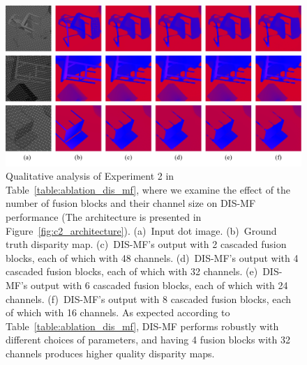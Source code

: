 \begin{figure}[t]
    \begin{center}
        \includegraphics[width=1.0\linewidth]{images/chapter2/supp_figures/ablation_mf_blch.jpg}
    \end{center}
   \caption{Qualitative analysis of Experiment 2 in Table~\ref{table:ablation_dis_mf}, where we examine the effect of the number of fusion blocks and their channel size on DIS-MF performance (The architecture is presented in Figure~\ref{fig:c2_architecture}). (a)~Input dot image. (b)~Ground truth disparity map. (c)~DIS-MF's output with 2 cascaded fusion blocks, each of which with 48 channels. (d)~DIS-MF's output with 4 cascaded fusion blocks, each of which with 32 channels. (e)~DIS-MF's output with 6 cascaded fusion blocks, each of which with 24 channels. (f)~DIS-MF's output with 8 cascaded fusion blocks, each of which with 16 channels. As expected according to Table~\ref{table:ablation_dis_mf}, DIS-MF performs robustly with different choices of parameters, and having 4 fusion blocks with 32 channels produces higher quality disparity maps.}
    \label{fig:c2_ablation_mf_blch}
\end{figure}

